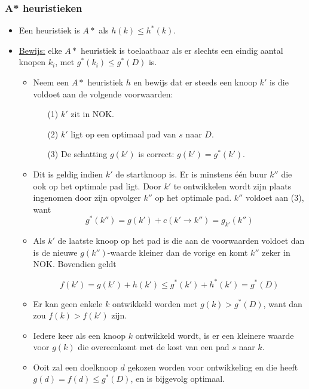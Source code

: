 \subsubsection{A* heuristieken}
\begin{itemize}
	\item Een heuristiek is $A*$ als $h(k) \leq h^*(k)$.
	\item \underline{Bewijs:} elke $A*$ heuristiek is toelaatbaar als er slechts een eindig aantal knopen $k_i$, met $g^*(k_i) \leq g^*(D)$ is.
	\begin{itemize}
		\item Neem een $A*$ heuristiek $h$ en bewijs dat er steeds een knoop $k'$ is die voldoet aan de volgende voorwaarden:
		\begin{enumerate}
			\item[(1)] $k'$ zit in NOK.
			\item[(2)] $k'$ ligt op een optimaal pad van $s$ naar $D$.
			\item[(3)] De schatting $g(k')$ is correct: $g(k') = g^*(k')$.
		\end{enumerate}
	\item Dit is geldig indien $k'$ de startknoop is. Er is minstens één buur $k''$ die ook op het optimale pad ligt. Door $k'$ te ontwikkelen wordt zijn plaats ingenomen door zijn opvolger $k''$ op het optimale pad.  $k''$ voldoet aan (3), want
	$$g^*(k'') = g(k') + c(k' \rightarrow k'') = g_{k'}(k'')$$
	\item Als $k'$ de laatste knoop op het pad is die aan de voorwaarden voldoet dan is de nieuwe $g(k'')$-waarde kleiner dan de vorige en komt $k''$ zeker in NOK. Bovendien geldt
	
	$$f(k') = g(k') + h(k') \leq g^*(k') + h^*(k') = g^*(D)$$
	
	\item Er kan geen enkele $k$ ontwikkeld worden met $g(k) > g^*(D)$, want dan zou $f(k) > f(k')$ zijn.
	\item Iedere keer als een knoop $k$ ontwikkeld wordt, is er een kleinere waarde voor $g(k)$ die overeenkomt met de kost van een pad $s$ naar $k$.
	\item Ooit zal een doelknoop $d$ gekozen worden voor ontwikkeling en die heeft $g(d) = f(d) \leq g^*(D)$, en is bijgevolg optimaal.
	\end{itemize}
\end{itemize}

